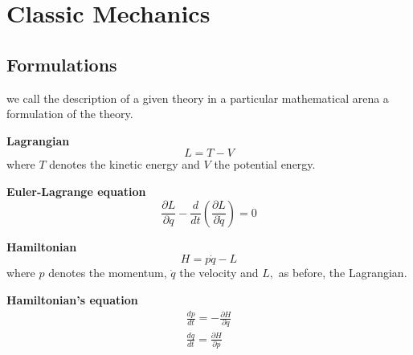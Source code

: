 \chapter{Classic Mechanics}
\section{Formulations}
we call the description of a given theory in a particular mathematical arena a formulation of the theory.

\textbf{Lagrangian}
$$
L=T-V
$$
where $T$ denotes the kinetic energy and $V$ the potential energy.

\textbf{Euler-Lagrange equation}
$$
\frac{\partial L}{\partial q}-\frac{d}{d t}\left(\frac{\partial L}{\partial \dot{q}}\right)=0
$$

\textbf{Hamiltonian}
$$
H=p \dot{q}-L
$$
where $p$ denotes the momentum, $\dot{q}$ the velocity and $L,$ as before,
the Lagrangian. 

\textbf{Hamiltonian's equation}
$$
\begin{array}{l}{\frac{d p}{d t}=-\frac{\partial H}{\partial q}} \\ {\frac{d q}{d t}=\frac{\partial H}{\partial p}}\end{array}
$$

